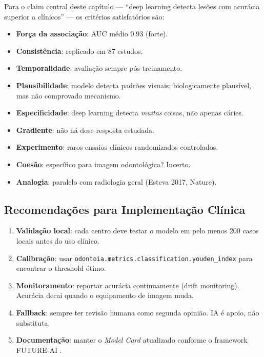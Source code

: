 Para o claim central deste capítulo --- ``deep learning detecta
lesões com acurácia superior a clínicos'' --- os critérios
satisfatórios são:

\begin{itemize}
    \item[$\checkmark$] \textbf{Força da associação}: AUC médio 0.93 (forte).
    \item[$\checkmark$] \textbf{Consistência}: replicado em 87 estudos.
    \item[$\checkmark$] \textbf{Temporalidade}: avaliação sempre pós-treinamento.
    \item[$\sim$] \textbf{Plausibilidade}: modelo detecta padrões
    visuais; biologicamente plausível, mas não comprovado mecanismo.
    \item[$\times$] \textbf{Especificidade}: deep learning detecta
    \emph{muitas} coisas, não apenas cáries.
    \item[$\times$] \textbf{Gradiente}: não há dose-resposta estudada.
    \item[$\times$] \textbf{Experimento}: raros ensaios clínicos
    randomizados controlados.
    \item[$\times$] \textbf{Coesão}: específico para imagem odontológica?
    Incerto.
    \item[$\sim$] \textbf{Analogia}: paralelo com radiologia geral
    (Esteva 2017, Nature).
\end{itemize}


\subsection*{Recomendações para Implementação Clínica}

\begin{enumerate}
    \item \textbf{Validação local}: cada centro deve testar o modelo
    em pelo menos 200 casos locais antes do uso clínico.
    \item \textbf{Calibração}: usar \texttt{odontoia.metrics.classification.youden\_index}
    para encontrar o threshold ótimo.
    \item \textbf{Monitoramento}: reportar acurácia continuamente
    (drift monitoring). Acurácia decai quando o equipamento de
    imagem muda.
    \item \textbf{Fallback}: sempre ter revisão humana como
    segunda opinião. IA é apoio, não substituta.
    \item \textbf{Documentação}: manter o \emph{Model Card} atualizado
    conforme o framework FUTURE-AI \cite{futureai2025}.
\end{enumerate}

